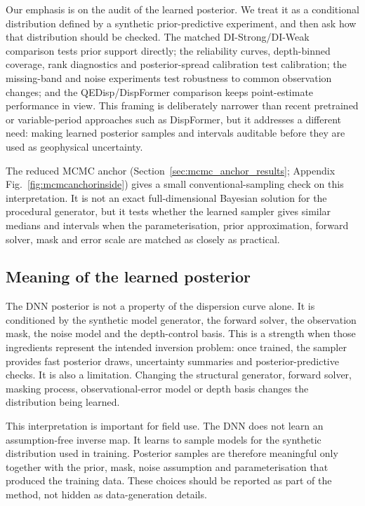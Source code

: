 \documentclass[referee]{gji}
\begin{document}
Our emphasis is on the audit of the learned posterior. We treat it as a conditional distribution defined by a synthetic prior-predictive experiment, and then ask how that distribution should be checked. The matched DI-Strong/DI-Weak comparison tests prior support directly; the reliability curves, depth-binned coverage, rank diagnostics and posterior-spread calibration test calibration; the missing-band and noise experiments test robustness to common observation changes; and the QEDisp/DispFormer comparison keeps point-estimate performance in view. This framing is deliberately narrower than recent pretrained or variable-period approaches such as DispFormer, but it addresses a different need: making learned posterior samples and intervals auditable before they are used as geophysical uncertainty.

The reduced MCMC anchor (Section~\ref{sec:mcmc_anchor_results}; Appendix Fig.~\ref{fig:mcmcanchorinside}) gives a small conventional-sampling check on this interpretation. It is not an exact full-dimensional Bayesian solution for the procedural generator, but it tests whether the learned sampler gives similar medians and intervals when the parameterisation, prior approximation, forward solver, mask and error scale are matched as closely as practical.

\subsection{Meaning of the learned posterior}

The DNN posterior is not a property of the dispersion curve alone. It is conditioned by the synthetic model generator, the forward solver, the observation mask, the noise model and the depth-control basis. This is a strength when those ingredients represent the intended inversion problem: once trained, the sampler provides fast posterior draws, uncertainty summaries and posterior-predictive checks. It is also a limitation. Changing the structural generator, forward solver, masking process, observational-error model or depth basis changes the distribution being learned.

This interpretation is important for field use. The DNN does not learn an assumption-free inverse map. It learns to sample models for the synthetic distribution used in training. Posterior samples are therefore meaningful only together with the prior, mask, noise assumption and parameterisation that produced the training data. These choices should be reported as part of the method, not hidden as data-generation details.
\end{document}
